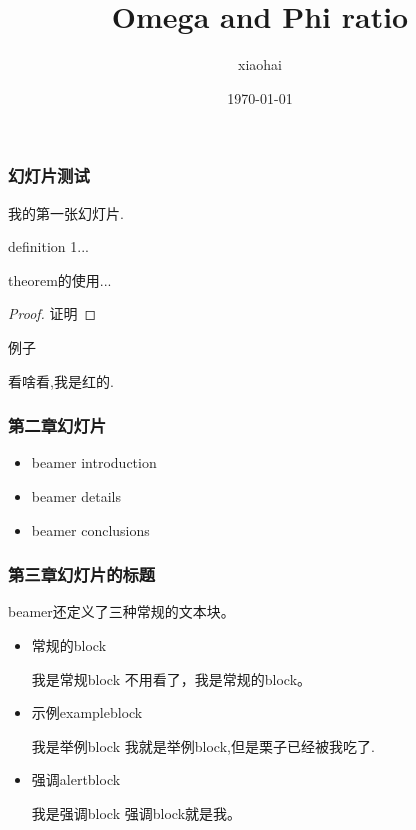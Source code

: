 \documentclass[8pt]{beamer}
\title{Omega and Phi ratio}
\author{xiaohai}
\date{\today}
\begin{document}
\begin{frame}
  \titlepage
\end{frame}

\begin{frame}
  \frametitle{{幻灯片测试}} %
  我的第一张幻灯片.
  \begin{definition}
    definition 1...
  \end{definition}

  \begin{theorem}
    theorem的使用...
  \end{theorem}

  \begin{proof}
    证明
  \end{proof}

  \begin{example}
    例子
  \end{example}

  \alert{看啥看,我是红的.}

\end{frame}

\begin{frame}
  \frametitle{第二章幻灯片} %
  \begin{itemize}
  \item beamer introduction %
  \item beamer details %
  \item beamer conclusions
  \end{itemize}
\end{frame}

\begin{frame}
  \frametitle{第三章幻灯片的标题}

  beamer还定义了三种常规的文本块。
  \begin{itemize}
  \item 常规的block
    \begin{block}{我是常规block}
      不用看了，我是常规的block。
    \end{block}
  \item 示例exampleblock
    \begin{exampleblock}{我是举例block}
      我就是举例block,但是栗子已经被我吃了.
    \end{exampleblock}
  \item 强调alertblock
    \begin{alertblock}{我是强调block}
      强调block就是我。
    \end{alertblock}
  \end{itemize}
  
\end{frame}
\end{document}

